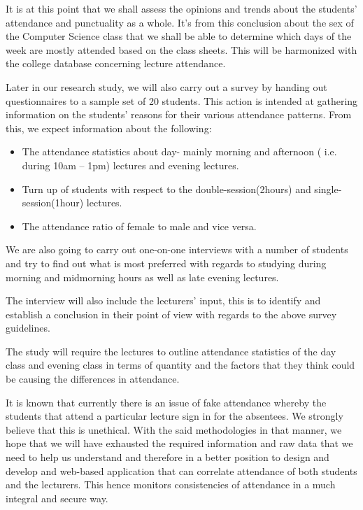 \documentclass[]{report}
\begin{document}
\begin{flushleft}
 It is at this point that we shall assess the opinions and trends about the students’ attendance and punctuality as a whole. It’s from this conclusion about the sex of the Computer Science class that we shall be able to determine which days of the week are mostly attended based on the class sheets. This will be harmonized with the college database concerning lecture attendance.\linebreak
 
  Later in our research study, we will also carry out a survey by handing out questionnaires to a sample set of 20 students. This action is intended at gathering information on the students’ reasons for their various attendance patterns.
 From this, we expect information about the following:
 \begin{itemize}
 	\item 	The attendance statistics about day- mainly morning and afternoon (  i.e. during 10am – 1pm) lectures and evening lectures.
 	\item Turn up of students with respect to the double-session(2hours) and single-session(1hour) lectures.
 	\item 	The attendance ratio of female to male and vice versa.
 	
 \end{itemize}
We are also going to carry out one-on-one interviews with a number of students and try to find out what is most preferred with regards to studying during morning and midmorning hours as well as late evening lectures.\linebreak

The interview will also include the lecturers’ input, this is to identify and establish a conclusion in their point of view with regards to the above survey guidelines.\linebreak

The study will require the lectures to outline attendance statistics of the day class and evening class in terms of quantity and the factors that they think could be causing the differences in attendance.\linebreak

It is known that currently there is an issue of fake attendance whereby the students that attend a particular lecture sign in for the absentees. We strongly believe that this is unethical. With the said methodologies in that manner, we hope that we will have exhausted the required information and raw data that we need to help us understand and therefore in a better position to design and develop and web-based application that can correlate attendance of both students and the lecturers. This hence monitors consistencies of attendance in a much integral and secure way.\linebreak


\end{flushleft}
\end{document}
